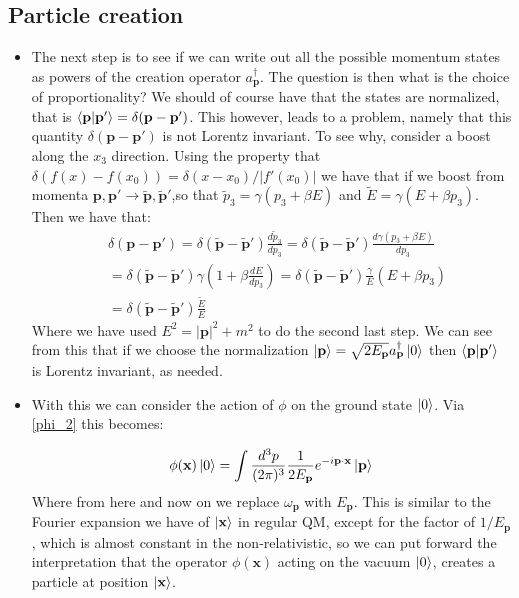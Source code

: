\documentclass[11pt]{article}
\numberwithin{equation}{section}
\begin{document}
\subsection{Particle creation}
\begin{itemize}
\item The next step is to see if we can write out all the possible momentum states as powers of the creation operator $a^{\dagger}_{\textbf{p}}$. The question is then what is the choice of proportionality? We should of course have that the states are normalized, that is $\braket{\textbf{p}|\textbf{p}'} = \delta(\textbf{p}-\textbf{p}')$. This however, leads to a problem, namely that this quantity $\delta(\textbf{p}-\textbf{p}')$ is not Lorentz invariant. To see why, consider a boost along the $x_3$ direction. Using the property that $\delta(f(x)-f(x_0)) = \delta(x-x_0)/|f'(x_0)|$ we have that if we boost from momenta $\textbf{p},\textbf{p}' \rightarrow \tilde{\textbf{p}},\tilde{\textbf{p}}'$,so that $\tilde{p}_3 = \gamma(p_3+\beta E)$ and $\tilde{E} = \gamma(E + \beta p_3)$. Then we have that: 
\begin{equation*}
  \begin{split}
   &  \delta(\textbf{p}-\textbf{p}') = \delta(\tilde{\textbf{p}}-\tilde{\textbf{p}}') \frac{d \tilde{p}_3}{d p_3}  = \delta(\tilde{\textbf{p}}-\tilde{\textbf{p}}') \frac{d \gamma(p_3+\beta E)}{dp_3} \\
    &  =   \delta(\tilde{\textbf{p}}-\tilde{\textbf{p}}')\gamma \left(1 + \beta\frac{d E}{dp_3}\right)  =  \delta(\tilde{\textbf{p}}-\tilde{\textbf{p}}')\frac{\gamma}{E} \left(E + \beta p_3\right) \\
    & =  \delta(\tilde{\textbf{p}}-\tilde{\textbf{p}}')\frac{\tilde{E}}{E} 
  \end{split}
\end{equation*}
Where we have used $E^2 = |\textbf{p}|^2+m^2$ to do the second last step. We can see from this that if we choose the normalization $\ket{\textbf{p}} = \sqrt{2E_{\textbf{p}}}a^{\dagger}_{\textbf{p}}\ket{0}$ then $\braket{\textbf{p}|\textbf{p}'}$ is Lorentz invariant, as needed. 

\item With this we can consider the action of $\phi$ on the ground state $\ket{0}$. Via \ref{phi_2} this becomes: 

\[
  \phi(\textbf{x})\ket{0} = \int \frac{d^3p}{(2\pi)^3}\frac{1}{2E_{\textbf{p}}}e^{-i\textbf{p}\cdot \textbf{x}}\ket{\textbf{p}} 
\]
Where from here and now on we replace $\omega_{\textbf{p}}$ with $E_{\textbf{p}}$. This is similar to the Fourier expansion we have of $\ket{\textbf{x}}$ in regular QM, except for the factor of $1/E_{\textbf{p}}$, which is almost constant in the non-relativistic, so we can put forward the interpretation that the operator $\phi(\textbf{x})$ acting on the vacuum $\ket{0}$, creates a particle at position $\ket{\textbf{x}}$. 
\end{itemize}
\end{document}
